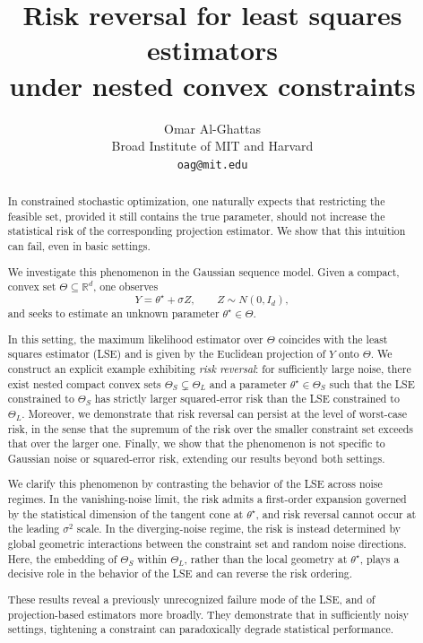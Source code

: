 \documentclass[11pt]{article}
\title{Risk reversal for least squares estimators\\ under nested convex constraints}
\author{Omar Al-Ghattas\\
\small Broad Institute of MIT and Harvard\\
\small \texttt{oag@mit.edu}}
\date{}
\theoremstyle{plain}
\theoremstyle{definition}
\providecommand{\mathbbm}{\mathbb} %
\newcommand{\R}{\mathbbm{R}}
\begin{document}
\maketitle

\begin{abstract}
In constrained stochastic optimization, one naturally expects that restricting the feasible set, provided it still contains the true parameter, should not increase the statistical risk of the corresponding projection estimator. We show that this intuition can fail, even in basic settings.

We investigate this phenomenon in the Gaussian sequence model. Given a compact, convex set $\Theta \subseteq \R^d$, one observes
\[
Y = \theta^\star + \sigma Z, \qquad Z \sim N(0, I_d),
\]
and seeks to estimate an unknown parameter $\theta^\star \in \Theta$. 

In this setting, the maximum likelihood estimator over $\Theta$ coincides with the least squares estimator (LSE) and is given by the Euclidean projection of $Y$ onto $\Theta$. We construct an explicit example exhibiting \emph{risk reversal}: for sufficiently large noise, there exist nested compact convex sets $\Theta_S \subsetneq \Theta_L$ and a parameter $\theta^\star \in \Theta_S$ such that the LSE constrained to $\Theta_S$ has strictly larger squared-error risk than the LSE constrained to $\Theta_L$. Moreover, we demonstrate that risk reversal can persist at the level of worst-case risk, in the sense that the supremum of the risk over the smaller constraint set exceeds that over the larger one. Finally, we show that the phenomenon is not specific to Gaussian noise or squared-error risk, extending our results beyond both settings.


We clarify this phenomenon by contrasting the behavior of the LSE across noise regimes. In the vanishing-noise limit, the risk admits a first-order expansion governed by the statistical dimension of the tangent cone at $\theta^\star$, and risk reversal cannot occur at the leading $\sigma^2$ scale. In the diverging-noise regime, the risk is instead determined by global geometric interactions between the constraint set and random noise directions. Here, the embedding of $\Theta_S$ within $\Theta_L$, rather than the local geometry at $\theta^\star$, plays a decisive role in the behavior of the LSE and can reverse the risk ordering.

These results reveal a previously unrecognized failure mode of the LSE, and of projection-based estimators more broadly. They demonstrate that in sufficiently noisy settings, tightening a constraint can paradoxically degrade statistical performance.
\end{abstract}
\end{document}
